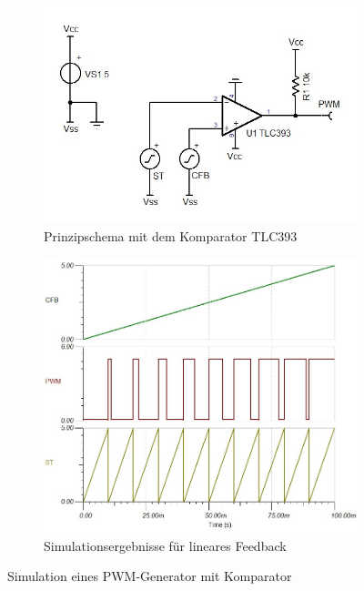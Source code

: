 \begin{figure}[h!]
	\centering
	\begin{subfigure}[b]{0.45\textwidth}
		\includegraphics[width=\textwidth]{src/DC/sim/sch-pwm-01.jpg}
		\caption{Prinzipschema mit dem Komparator TLC393}
	\end{subfigure}
	\begin{subfigure}[b]{0.45\textwidth}
		\includegraphics[width=\textwidth]{src/DC/sim/pwm-01.jpg}
		\caption{Simulationsergebnisse für lineares Feedback}
	\end{subfigure}
	\caption{Simulation eines PWM-Generator mit Komparator}
\end{figure}

